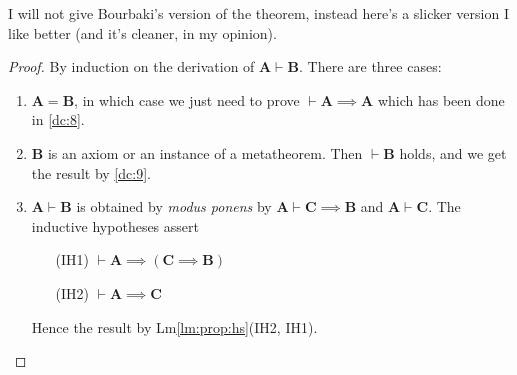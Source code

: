 \documentclass{amsart}%
\newcommand\metavariable[1]{\boldsymbol{#1}}
\begin{document}
I will not give Bourbaki's version of the theorem, instead here's a
slicker version I like better (and it's cleaner, in my opinion).

\begin{proof}
By induction on the derivation of
$\metavariable{A}\vdash\metavariable{B}$. There are three cases:
\begin{enumerate}
\item $\metavariable{A}=\metavariable{B}$, in which case we just need to
  prove $\vdash\metavariable{A}\implies\metavariable{A}$ which has been
  done in \ref{dc:8}.
\item $\metavariable{B}$ is an axiom or an instance of a
  metatheorem. Then $\vdash\metavariable{B}$ holds, and we get the
  result by \ref{dc:9}.
\item $\metavariable{A}\vdash\metavariable{B}$ is obtained by
  \textit{modus ponens} by $\metavariable{A}\vdash\metavariable{C}\implies\metavariable{B}$
  and $\metavariable{A}\vdash\metavariable{C}$. The inductive hypotheses
  assert
  \begin{itemize}
  \item[(IH1)] $\vdash\metavariable{A}\implies(\metavariable{C}\implies\metavariable{B})$
  \item[(IH2)] $\vdash\metavariable{A}\implies\metavariable{C}$
  \end{itemize}
  Hence the result by Lm\ref{lm:prop:hs}(IH2, IH1).\qedhere

\end{enumerate}
\end{proof}
\end{document}
